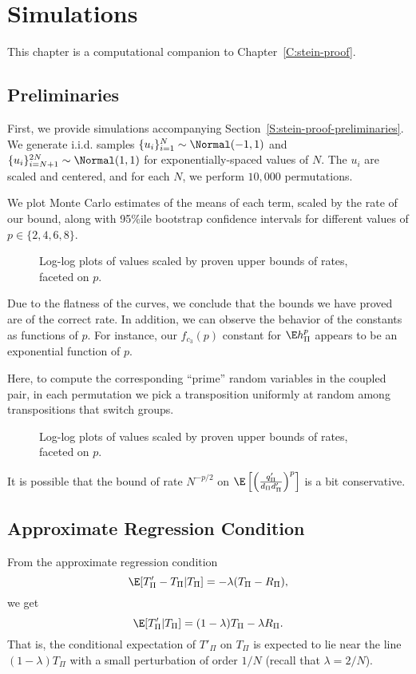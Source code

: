 \chapter{Simulations}
\label{C:simulations}
This chapter is a computational companion to Chapter~\ref{C:stein-proof}.

\section{Preliminaries}
First, we provide simulations accompanying
Section~\ref{S:stein-proof-preliminaries}.  We generate i.i.d. samples
$\{u_i\}_{i=1}^{N} \sim \Normal(-1, 1)$ and
$\{u_i\}_{i=N+1}^{2N} \sim \Normal(1, 1)$ for exponentially-spaced values of
$N$.  The $u_i$ are scaled and centered, and for each $N$, we perform
$10,000$ permutations.

We plot Monte Carlo estimates of the means of each term, scaled by the
rate of our bound, along with 95\%ile bootstrap confidence intervals
for different values of $p \in \{2, 4, 6, 8\}$.

\begin{figure}[!ht]
  \centering
  
  \caption{Log-log plots of values scaled by proven upper bounds of rates, faceted on $p$.}
\end{figure}
Due to the flatness of the curves, we conclude that the bounds we have
proved are of the correct rate.  In addition, we can observe the
behavior of the constants as functions of $p$.  For instance, our
$f_{c_3}(p)$ constant for $\E h_{\Pi}^p$ appears to be an exponential
function of $p$.
\clearpage

Here, to compute the corresponding ``prime'' random variables in the
coupled pair, in each permutation we pick a transposition uniformly at
random among transpositions that switch groups.

\begin{figure}[!ht]
  \centering
  
  \caption{Log-log plots of values scaled by proven upper bounds of rates, faceted on $p$.}
\end{figure}
It is possible that the bound of rate $N^{-p/2}$ on
$\E \left [ \left ( \frac{q_{\Pi}'}{d_{\Pi}d_{\Pi}'} \right )^p \right ]$ is a bit conservative.
\clearpage

\section{Approximate Regression Condition}
From the approximate regression condition
\begin{equation*}
  \E [T'_{\Pi} - T_{\Pi} | T_{\Pi}] = -\lambda (T_{\Pi} - R_{\Pi}),
\end{equation*}
we get
\begin{equation*}
  \E [T'_{\Pi}| T_{\Pi}] = (1-\lambda) T_{\Pi} - \lambda R_{\Pi}.
\end{equation*}
That is, the conditional expectation of $T'_{\Pi}$ on $T_{\Pi}$ is expected to lie near the line
$(1-\lambda) T_{\Pi}$ with a small perturbation of order $1 / N$ (recall that $\lambda = 2 / N$).

